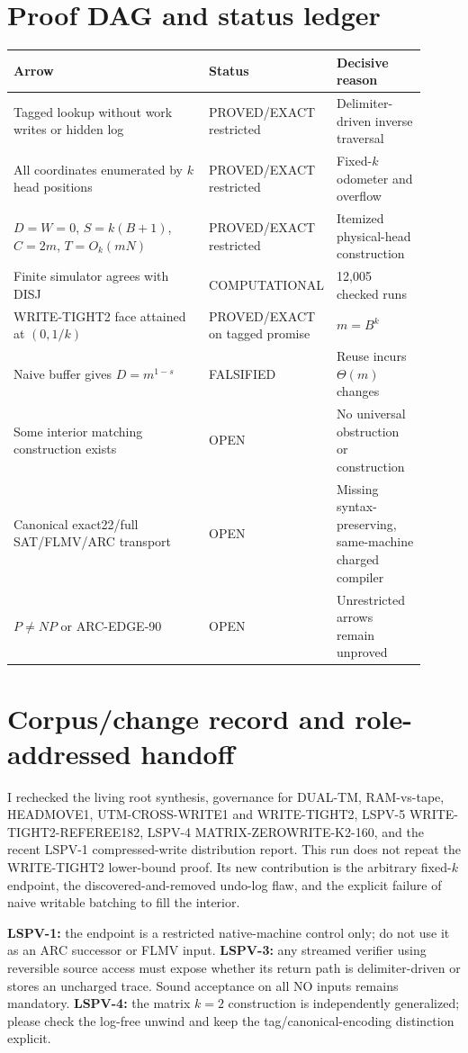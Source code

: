 \documentclass[11pt]{article}
\begin{document}
\section{Proof DAG and status ledger}
\begin{center}
\begin{tabular}{p{0.50\linewidth}p{0.19\linewidth}p{0.22\linewidth}}
\toprule
Arrow & Status & Decisive reason \\
\midrule
Tagged lookup without work writes or hidden log & PROVED/EXACT restricted &
Delimiter-driven inverse traversal\\
All coordinates enumerated by $k$ head positions & PROVED/EXACT restricted &
Fixed-$k$ odometer and overflow\\
$D=W=0$, $S=k(B+1)$, $C=2m$, $T=O_k(mN)$ & PROVED/EXACT restricted &
Itemized physical-head construction\\
Finite simulator agrees with DISJ & COMPUTATIONAL & 12,005 checked runs\\
WRITE-TIGHT2 face attained at $(0,1/k)$ & PROVED/EXACT on tagged promise &
$m=B^k$\\
Naive buffer gives $D=m^{1-s}$ & FALSIFIED & Reuse incurs $\Theta(m)$ changes\\
Some interior matching construction exists & OPEN & No universal obstruction
or construction\\
Canonical exact22/full SAT/FLMV/ARC transport & OPEN & Missing syntax-preserving,
same-machine charged compiler\\
$P\ne NP$ or ARC-EDGE-90 & OPEN & Unrestricted arrows remain unproved\\
\bottomrule
\end{tabular}
\end{center}

\section{Corpus/change record and role-addressed handoff}
I rechecked the living root synthesis, governance for DUAL-TM,
RAM-vs-tape, HEADMOVE1, UTM-CROSS-WRITE1 and WRITE-TIGHT2, LSPV-5
WRITE-TIGHT2-REFEREE182, LSPV-4 MATRIX-ZEROWRITE-K2-160, and the recent
LSPV-1 compressed-write distribution report.  This run does not repeat the
WRITE-TIGHT2 lower-bound proof.  Its new contribution is the arbitrary
fixed-$k$ endpoint, the discovered-and-removed undo-log flaw, and the explicit
failure of naive writable batching to fill the interior.

\textbf{LSPV-1:} the endpoint is a restricted native-machine control only;
do not use it as an ARC successor or FLMV input.  \textbf{LSPV-3:} any
streamed verifier using reversible source access must expose whether its
return path is delimiter-driven or stores an uncharged trace.  Sound
acceptance on all NO inputs remains mandatory.  \textbf{LSPV-4:} the matrix
$k=2$ construction is independently generalized; please check the log-free
unwind and keep the tag/canonical-encoding distinction explicit.
\end{document}
